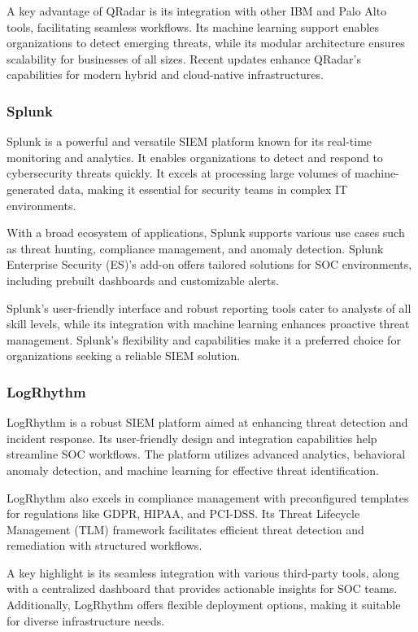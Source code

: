 A key advantage of QRadar is its integration with other IBM and Palo Alto tools, facilitating seamless workflows. 
Its machine learning support enables organizations to detect emerging threats, while its modular architecture ensures scalability for businesses of all sizes. 
Recent updates enhance QRadar's capabilities for modern hybrid and cloud-native infrastructures.

\subsubsection{Splunk}
Splunk is a powerful and versatile SIEM platform known for its real-time monitoring and analytics. 
It enables organizations to detect and respond to cybersecurity threats quickly. 
It excels at processing large volumes of machine-generated data, making it essential for security teams in complex IT environments.

With a broad ecosystem of applications, Splunk supports various use cases such as threat hunting, compliance management, and anomaly detection. 
Splunk Enterprise Security (ES)'s add-on offers tailored solutions for SOC environments, including prebuilt dashboards and customizable alerts. 

Splunk's user-friendly interface and robust reporting tools cater to analysts of all skill levels, while its integration with machine learning enhances proactive threat management. 
Splunk's flexibility and capabilities make it a preferred choice for organizations seeking a reliable SIEM solution.

\subsubsection{LogRhythm}
LogRhythm is a robust SIEM platform aimed at enhancing threat detection and incident response. 
Its user-friendly design and integration capabilities help streamline SOC workflows. 
The platform utilizes advanced analytics, behavioral anomaly detection, and machine learning for effective threat identification. 

LogRhythm also excels in compliance management with preconfigured templates for regulations like GDPR, HIPAA, and PCI-DSS. 
Its Threat Lifecycle Management (TLM) framework facilitates efficient threat detection and remediation with structured workflows. 

A key highlight is its seamless integration with various third-party tools, along with a centralized dashboard that provides actionable insights for SOC teams. 
Additionally, LogRhythm offers flexible deployment options, making it suitable for diverse infrastructure needs.

